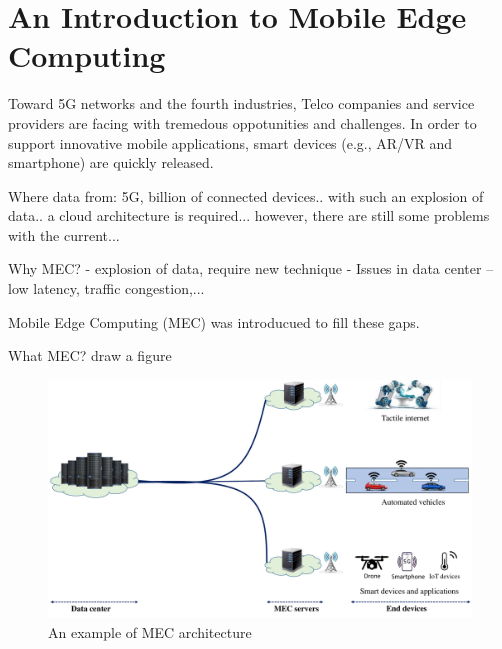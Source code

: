 \section{An Introduction to Mobile Edge Computing}  \label{intro}


Toward 5G networks and the fourth industries, Telco companies and service providers are facing with tremedous oppotunities and challenges. In order to support innovative mobile applications, smart devices (e.g., AR/VR and smartphone) are quickly released.


Where data from: 5G, billion of connected devices.. with  such an explosion of data.. a cloud architecture is required... however, there are still some problems with the current...


Why MEC? 
  - explosion of data, require new technique
  - Issues in data center -- low latency, traffic congestion,...

Mobile Edge Computing (MEC) was introducued to fill these gaps.

What MEC? draw a figure


\begin{figure}[H]
  \begin{center}
   \includegraphics[width=13cm]{./figures/mec-arch.pdf}
   \caption{An example of MEC architecture}
   \label{fig:mec-arch}
   \end{center}
\end{figure}
